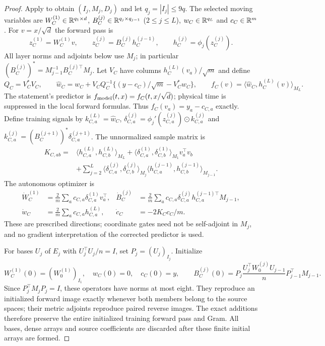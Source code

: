 \begin{proof}
Apply  to obtain $(I_j,M_j,D_j)$ and let
$q_j=|I_j|\le9q$. The selected moving variables are
$W_C^{(1)}\in\mathbb R^{q_1\times d}$,
$B_C^{(j)}\in\mathbb R^{q_j\times q_{j-1}}$ ($2\le j\le L$),
$w_C\in\mathbb R^{q_L}$ and $c_C\in\mathbb R^m$.
For $v=x/\sqrt d$ the forward pass is
\[
 z_C^{(1)}=W_C^{(1)}v,\qquad
 z_C^{(j)}=B_C^{(j)}h_C^{(j-1)},\qquad
 h_C^{(j)}=\phi_j(z_C^{(j)}).
\]
All layer norms and adjoints below use $M_j$; in particular
$(B_C^{(j)})^*=M_{j-1}^{-1}B_C^{(j)\top}M_j$.
Let $V_C$ have columns $h_C^{(L)}(v_a)/\sqrt m$ and define
\begin{equation}
 Q_C=V_C^*V_C,\qquad
 \widehat w_C=w_C+V_CQ_C^{-1}
       \{(y-c_C)/\sqrt m-V_C^*w_C\},\qquad
 f_C(v)=\langle\widehat w_C,h_C^{(L)}(v)\rangle_{M_L}.
 \label{cp:selected-readout}
\end{equation}
The statement's predictor is $f_{\rm model}(t,x)=f_C(t,x/\sqrt d)$;
physical time is suppressed in the local forward formulas.
Thus $f_C(v_a)=y_a-c_{C,a}$ exactly. Define training signals by
$k_{C,a}^{(L)}=\widehat w_C$,
$\delta_{C,a}^{(j)}=\phi_j'(z_{C,a}^{(j)})\odot k_{C,a}^{(j)}$ and
$k_{C,a}^{(j)}=(B_C^{(j+1)})^*\delta_{C,a}^{(j+1)}$.
The unnormalized sample matrix is
\begin{align}
 K_{C,ab}={}&\langle h_{C,a}^{(L)},h_{C,b}^{(L)}\rangle_{M_L}
 +\langle\delta_{C,a}^{(1)},\delta_{C,b}^{(1)}\rangle_{M_1}v_a^\top v_b
 \nonumber\\
 &+\sum_{j=2}^L\langle\delta_{C,a}^{(j)},\delta_{C,b}^{(j)}\rangle_{M_j}
                  \langle h_{C,a}^{(j-1)},h_{C,b}^{(j-1)}\rangle_{M_{j-1}}.
 \label{cp:selected-gram}
\end{align}
The autonomous optimizer is
\begin{align}
 \dot W_C^{(1)}&=\frac2m\sum_a c_{C,a}\delta_{C,a}^{(1)}v_a^\top,
 &\dot B_C^{(j)}&=\frac2m\sum_a c_{C,a}\delta_{C,a}^{(j)}
                                      h_{C,a}^{(j-1)\top}M_{j-1},
 \nonumber\\
 \dot w_C&=\frac2m\sum_a c_{C,a}h_{C,a}^{(L)},
 &\dot c_C&=-2K_Cc_C/m.
 \label{cp:selected-flow}
\end{align}
These are prescribed directions; coordinate gates need not be self-adjoint
in $M_j$, and no gradient interpretation of the corrected predictor is used.

For bases $U_j$ of $E_j$ with $U_j^\top U_j/n=I$, set $P_j=(U_j)_{I_j}$.
Initialize
\begin{equation}
 W_C^{(1)}(0)=(W_0^{(1)})_{I_1},\quad w_C(0)=0,\quad c_C(0)=y,
 \qquad
 B_C^{(j)}(0)=P_j\frac{U_j^\top W_0^{(j)}U_{j-1}}n
                         P_{j-1}^\top M_{j-1}.
 \label{cp:selected-initial}
\end{equation}
Since $P_j^\top M_jP_j=I$, these operators have norms at most eight.
They reproduce an initialized forward image exactly whenever both members
belong to the source spaces; their metric adjoints reproduce paired reverse
images. The exact additions therefore preserve the entire initialized
training forward pass and Gram. All bases, dense arrays and source
coefficients are discarded after these finite initial arrays are formed.


\end{proof}
